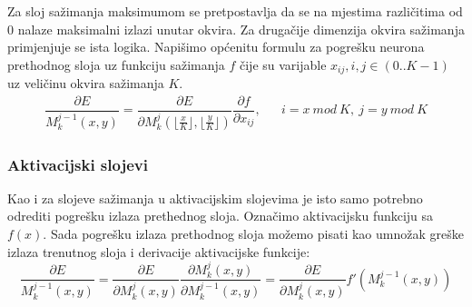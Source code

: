 \documentclass[times, utf8, zavrsni, numeric]{fer}
\begin{document}
Za sloj sažimanja maksimumom se pretpostavlja da se na mjestima različitima od 0 nalaze maksimalni izlazi unutar okvira. Za drugačije dimenzija okvira sažimanja primjenjuje se ista logika. Napišimo općenitu formulu za pogrešku neurona prethodnog sloja uz funkciju sažimanja $f$ čije su varijable $x_{ij}, i, j \in (0 .. K-1)$ uz veličinu okvira sažimanja $K$.
\begin{align}\label{eq:pool-sloj-err}
\dfrac{\partial E}{M^{j-1}_k (x, y)} = \dfrac{\partial E}{\partial M^j_k (\lfloor \frac{x}{K} \rfloor, \lfloor \frac{y}{K} \rfloor)} \dfrac{\partial f}{\partial x_{ij}}, && i = x\ mod\ K,\ j = y\ mod\ K
\end{align}  

\subsubsection{Aktivacijski slojevi}
Kao i za slojeve sažimanja u aktivacijskim slojevima je isto samo potrebno odrediti pogrešku izlaza prethednog sloja. Označimo aktivacijsku funkciju sa $f(x)$. Sada pogrešku izlaza prethodnog sloja možemo pisati kao umnožak greške izlaza trenutnog sloja i derivacije aktivacijske funkcije:
\begin{equation}\label{eq:act-sloj-err}
\dfrac{\partial E}{M^{j-1}_k (x, y)} = \dfrac{\partial E}{\partial M^j_k (x, y)} \dfrac{\partial M^j_k (x, y)}{\partial M^{j-1}_k (x, y)} = \dfrac{\partial E}{\partial M^j_k (x, y)} f'(M^{j-1}_k (x, y))
\end{equation}
\end{document}
